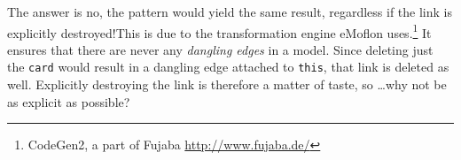 The answer is no, the pattern would yield the same result, regardless if the link is explicitly destroyed!This is due to the
transformation engine eMoflon uses.\footnote{CodeGen2, a part of Fujaba \url{http://www.fujaba.de/}} It ensures that there are never any \emph{dangling edges}
in a model. Since deleting just the \texttt{card} would result in a dangling edge attached to \texttt{this}, that link is deleted as well. Explicitly
destroying the link is therefore a matter of taste, so \ldots why not be as explicit as possible?





